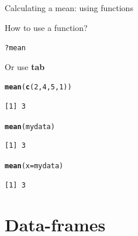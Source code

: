 \documentclass[10pt]{beamer}\usepackage[]{graphicx}\usepackage[]{color}
\makeatletter
\newcommand{\hlnum}[1]{\textcolor[rgb]{0.686,0.059,0.569}{#1}}%
\newcommand{\hlopt}[1]{\textcolor[rgb]{0,0,0}{#1}}%
\newcommand{\hlstd}[1]{\textcolor[rgb]{0.345,0.345,0.345}{#1}}%
\newcommand{\hlkwc}[1]{\textcolor[rgb]{0.333,0.667,0.333}{#1}}%
\newcommand{\hlkwd}[1]{\textcolor[rgb]{0.737,0.353,0.396}{\textbf{#1}}}%
\newenvironment{kframe}{%
 \def\at@end@of@kframe{}%
 \ifinner\ifhmode%
  \def\at@end@of@kframe{\end{minipage}}%
  \begin{minipage}{\columnwidth}%
 \fi\fi%
 \def\FrameCommand##1{\hskip\@totalleftmargin \hskip-\fboxsep
 \colorbox{shadecolor}{##1}\hskip-\fboxsep
     \hskip-\linewidth \hskip-\@totalleftmargin \hskip\columnwidth}%
 \MakeFramed {\advance\hsize-\width
   \@totalleftmargin\z@ \linewidth\hsize
   \@setminipage}}%
 {\par\unskip\endMakeFramed%
 \at@end@of@kframe}
\newenvironment{knitrout}{}{} %
\makeatother
\begin{document}
\begin{frame}[fragile]{Calculating a mean: using functions}%

  How to use a function?
\begin{knitrout}
\color{fgcolor}\begin{kframe}
\begin{alltt}
  \hlopt{?}\hlstd{mean}
\end{alltt}
\end{kframe}
\end{knitrout}

  Or use \textbf{tab}
\pause

\begin{knitrout}
\color{fgcolor}\begin{kframe}
\begin{alltt}
\hlkwd{mean}\hlstd{(}\hlkwd{c}\hlstd{(}\hlnum{2}\hlstd{,}\hlnum{4}\hlstd{,}\hlnum{5}\hlstd{,}\hlnum{1}\hlstd{))}
\end{alltt}
\begin{verbatim}
[1] 3
\end{verbatim}
\begin{alltt}
\hlkwd{mean}\hlstd{(mydata)}
\end{alltt}
\begin{verbatim}
[1] 3
\end{verbatim}
\begin{alltt}
\hlkwd{mean}\hlstd{(}\hlkwc{x} \hlstd{= mydata)}
\end{alltt}
\begin{verbatim}
[1] 3
\end{verbatim}
\end{kframe}
\end{knitrout}


\end{frame}

\section{Data-frames}
\end{document}
